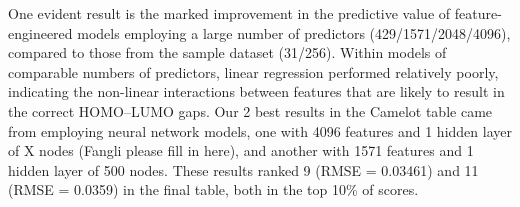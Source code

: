 \documentclass[11pt]{article}
\begin{document}
One evident result is the marked improvement in the predictive value of feature-engineered models employing a large number of predictors (429/1571/2048/4096), compared to those from the sample dataset (31/256). Within models of comparable numbers of predictors, linear regression performed relatively poorly, indicating the non-linear interactions between features that are likely to result in the correct HOMO--LUMO gaps. Our 2 best results in the Camelot table came from employing neural network models, one with 4096 features and 1 hidden layer of X nodes (Fangli please fill in here), and another with 1571 features and 1 hidden layer of 500 nodes. These results ranked 9 (RMSE = 0.03461) and 11 (RMSE = 0.0359) in the final table, both in the top 10\% of scores.







\end{document}
